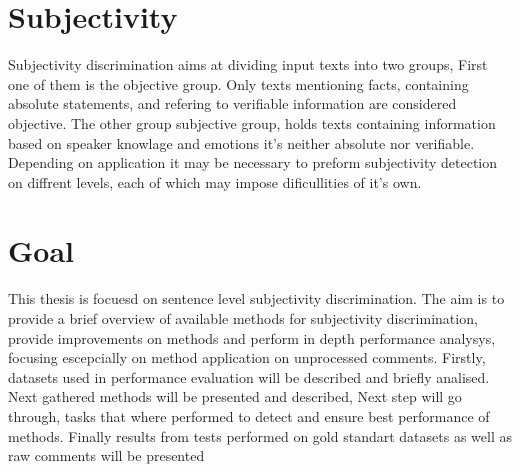\section{ Subjectivity }

Subjectivity discrimination aims at dividing input texts into two groups, First one of them is the objective group. 
Only texts mentioning facts, containing absolute statements, and refering to verifiable information are considered objective. 
The other group  subjective group, holds texts containing information based on speaker knowlage and emotions 
it's neither absolute nor verifiable. Depending on application it may be necessary to preform subjectivity detection on diffrent
levels, each of which may impose dificullities of it's own.  

\section{ Goal }

This thesis is focuesd on sentence level subjectivity discrimination. The aim is to provide a brief overview of available methods
for subjectivity discrimination, provide improvements on  methods and perform in depth performance analysys, focusing escepcially on method application on unprocessed comments. 
Firstly, datasets used in performance evaluation will be described and briefly analised. Next gathered methods will be presented and described, 
Next step will go through, tasks that where performed to detect and ensure best performance of methods. Finally results from tests performed on gold 
standart datasets as well as raw comments will be presented